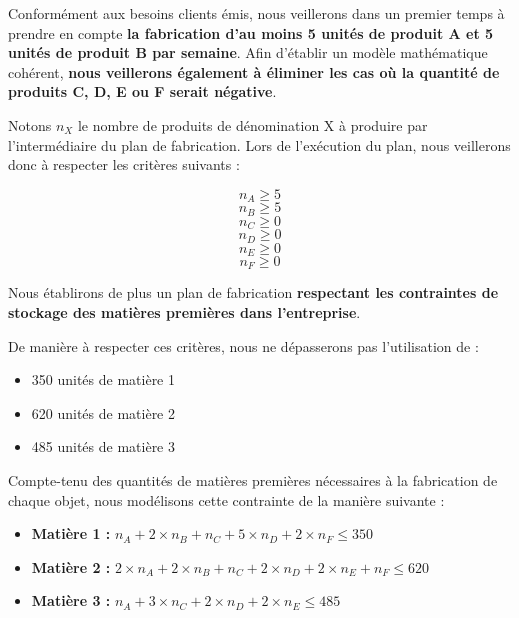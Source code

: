 \documentclass[a4paper,10pt]{article}
\begin{document}
Conformément aux besoins clients émis, nous veillerons dans un premier temps à prendre en compte \textbf{la fabrication d'au moins 5 unités de produit A et 5 unités de produit B par semaine}. Afin d'établir un modèle mathématique cohérent, \textbf{nous veillerons également à éliminer les cas où la quantité de produits C, D, E ou F serait négative}.\newline

Notons $n_X$ le nombre de produits de dénomination X à produire par l'intermédiaire du plan de fabrication. Lors de l'exécution du plan, nous veillerons donc à respecter les critères suivants :

$$n_A \geq 5$$
$$n_B \geq 5$$
$$n_C \geq 0$$
$$n_D \geq 0$$
$$n_E \geq 0$$
$$n_F \geq 0$$

Nous établirons de plus un plan de fabrication \textbf{respectant les contraintes de stockage des matières premières dans l'entreprise}.

De manière à respecter ces critères, nous ne dépasserons pas l'utilisation de :
\newline
\begin{itemize}
\item[\textbullet] 350 unités de matière 1
\item[\textbullet] 620 unités de matière 2
\item[\textbullet] 485 unités de matière 3\newline
\end{itemize}

Compte-tenu des quantités de matières premières nécessaires à la fabrication de chaque objet, nous modélisons cette contrainte de la manière suivante :
\newline
\begin{itemize}
\item[\textbullet]  \textbf{Matière 1 :} $n_A + 2 \times n_B + n_C + 5 \times n_D + 2 \times n_F \leq 350$
\item[\textbullet]  \textbf{Matière 2 :} $2 \times n_A + 2 \times n_B + n_C + 2 \times n_D + 2 \times n_E + n_F \leq 620$
\item[\textbullet]  \textbf{Matière 3 :} $n_A + 3 \times n_C + 2 \times n_D + 2 \times n_E \leq 485$\newline
\end{itemize}
\end{document}
